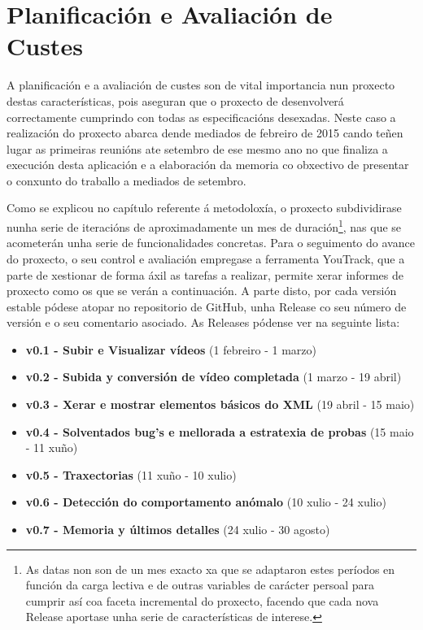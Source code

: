 \chapter{Planificación e Avaliación de Custes}

A planificación e a avaliación de custes son de vital importancia nun proxecto destas 
características, pois aseguran que o proxecto de desenvolverá correctamente cumprindo con todas as
especificacións desexadas. Neste caso a realización do proxecto abarca dende mediados de febreiro de
2015 cando teñen lugar as primeiras reunións ate setembro de ese mesmo ano no que finaliza a 
execución desta aplicación e a elaboración da memoria co obxectivo de presentar o conxunto do 
traballo a mediados de setembro.

Como se explicou no capítulo referente á metodoloxía, o proxecto subdividirase nunha serie de 
iteracións de aproximadamente un mes de duración\footnote{As datas non son de un mes exacto xa que
se adaptaron estes períodos en función da carga lectiva e de outras variables de carácter persoal 
para cumprir así coa faceta incremental do proxecto, facendo que cada nova Release aportase unha
serie de características de interese.}, nas que se acometerán unha serie de 
funcionalidades concretas. Para o seguimento do avance do proxecto, o seu control e avaliación 
empregase a ferramenta YouTrack, que a parte de xestionar de forma áxil as tarefas a realizar, 
permite xerar informes de proxecto como os que se verán a continuación. A parte disto, por cada 
versión estable pódese atopar no repositorio de GitHub, unha Release co seu número de versión e o 
seu comentario asociado. As Releases pódense ver na seguinte lista:

\begin{itemize}
 \item \textbf{v0.1 - Subir e Visualizar vídeos} (1 febreiro - 1 marzo) 
 \item \textbf{v0.2 - Subida y conversión de vídeo completada} (1 marzo - 19 abril)
 \item \textbf{v0.3 - Xerar e mostrar elementos básicos do XML} (19 abril - 15 maio)
 \item \textbf{v0.4 - Solventados bug's e mellorada a estratexia de probas} (15 maio - 11 xuño)
 \item \textbf{v0.5 - Traxectorias}  (11 xuño - 10 xulio)
 \item \textbf{v0.6 - Detección do comportamento anómalo} (10 xulio - 24 xulio)
 \item \textbf{v0.7 - Memoria y últimos detalles} (24 xulio - 30 agosto)
\end{itemize}

